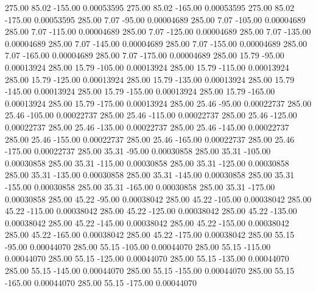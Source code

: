     275.00     85.02   -155.00     0.00053595
    275.00     85.02   -165.00     0.00053595
    275.00     85.02   -175.00     0.00053595
    285.00      7.07    -95.00     0.00004689
    285.00      7.07   -105.00     0.00004689
    285.00      7.07   -115.00     0.00004689
    285.00      7.07   -125.00     0.00004689
    285.00      7.07   -135.00     0.00004689
    285.00      7.07   -145.00     0.00004689
    285.00      7.07   -155.00     0.00004689
    285.00      7.07   -165.00     0.00004689
    285.00      7.07   -175.00     0.00004689
    285.00     15.79    -95.00     0.00013924
    285.00     15.79   -105.00     0.00013924
    285.00     15.79   -115.00     0.00013924
    285.00     15.79   -125.00     0.00013924
    285.00     15.79   -135.00     0.00013924
    285.00     15.79   -145.00     0.00013924
    285.00     15.79   -155.00     0.00013924
    285.00     15.79   -165.00     0.00013924
    285.00     15.79   -175.00     0.00013924
    285.00     25.46    -95.00     0.00022737
    285.00     25.46   -105.00     0.00022737
    285.00     25.46   -115.00     0.00022737
    285.00     25.46   -125.00     0.00022737
    285.00     25.46   -135.00     0.00022737
    285.00     25.46   -145.00     0.00022737
    285.00     25.46   -155.00     0.00022737
    285.00     25.46   -165.00     0.00022737
    285.00     25.46   -175.00     0.00022737
    285.00     35.31    -95.00     0.00030858
    285.00     35.31   -105.00     0.00030858
    285.00     35.31   -115.00     0.00030858
    285.00     35.31   -125.00     0.00030858
    285.00     35.31   -135.00     0.00030858
    285.00     35.31   -145.00     0.00030858
    285.00     35.31   -155.00     0.00030858
    285.00     35.31   -165.00     0.00030858
    285.00     35.31   -175.00     0.00030858
    285.00     45.22    -95.00     0.00038042
    285.00     45.22   -105.00     0.00038042
    285.00     45.22   -115.00     0.00038042
    285.00     45.22   -125.00     0.00038042
    285.00     45.22   -135.00     0.00038042
    285.00     45.22   -145.00     0.00038042
    285.00     45.22   -155.00     0.00038042
    285.00     45.22   -165.00     0.00038042
    285.00     45.22   -175.00     0.00038042
    285.00     55.15    -95.00     0.00044070
    285.00     55.15   -105.00     0.00044070
    285.00     55.15   -115.00     0.00044070
    285.00     55.15   -125.00     0.00044070
    285.00     55.15   -135.00     0.00044070
    285.00     55.15   -145.00     0.00044070
    285.00     55.15   -155.00     0.00044070
    285.00     55.15   -165.00     0.00044070
    285.00     55.15   -175.00     0.00044070
